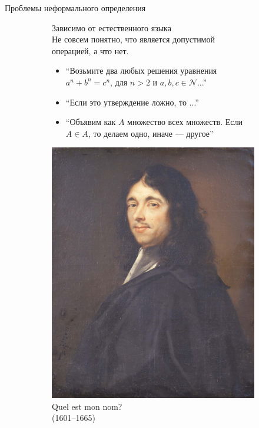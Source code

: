 \begin{frame}{Проблемы неформального определения}

\begin{figure}[ht]
  \begin{subfigure}[t]{.55\textwidth}
     \vspace{-13em}
     Зависимо от естественного языка\\

     \vspace{1em}
     Не совсем понятно, что является допустимой операцией, а что нет.
     \begin{itemize}
         \item \enquote{Возьмите два любых решения уравнения $a^n+b^n=c^n$, для $n>2$ и $a,b,c\in \mathcal{N}$...}
     	\item \enquote{Если это утверждение ложно, то ...}
     	\item \enquote{Объявим как $A$ множество всех множеств. Если $A\in A$, то делаем одно, иначе --- другое}
     \end{itemize}

  \end{subfigure}
\hspace{1cm}
  \begin{subfigure}[t]{.35\textwidth}
    \includegraphics[width=.95\textwidth]{Pierre_de_Fermat3.jpeg}\\
    \centering
    Quel est mon nom? \\(1601--1665)
  \end{subfigure}
\end{figure}

\end{frame}


